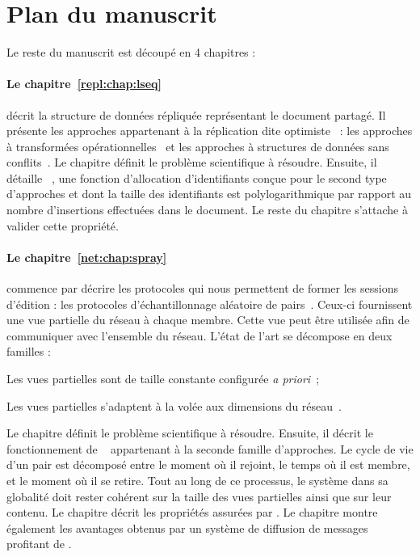 
\section{Plan du manuscrit}

Le reste du manuscrit est découpé en 4 chapitres :

\paragraph{Le chapitre~\ref{repl:chap:lseq}} décrit la structure de données
répliquée représentant le document partagé. Il présente les approches
appartenant à la réplication dite optimiste~\cite{demers1987epidemic,
  saito2005optimistic} : les approches à transformées
opérationnelles~\cite{sun1998achieving, sun2009contextbased} et les approches à
structures de données sans conflits~\cite{burckhardt2014replicated,
  shapiro2011conflict}. Le chapitre définit le problème scientifique à
résoudre. Ensuite, il détaille \LSEQ~\cite{nedelec2013concurrency,
  nedelec2013lseq}, une fonction d'allocation d'identifiants conçue pour le
second type d'approches et dont la taille des identifiants est polylogarithmique
par rapport au nombre d'insertions effectuées dans le document. Le reste du
chapitre s'attache à valider cette propriété.

\paragraph{Le chapitre~\ref{net:chap:spray}} commence par décrire les protocoles
qui nous permettent de former les sessions d'édition : les protocoles
d'échantillonnage aléatoire de pairs~\cite{jelasity2004peer,
  jelasity2007gossip}. Ceux-ci fournissent une vue partielle du réseau à chaque
membre. Cette vue peut être utilisée afin de communiquer avec l'ensemble du
réseau. L'état de l'art se décompose en deux familles :
\begin{inparaenum}[(i)]
\item Les vues partielles sont de taille constante configurée \emph{a
    priori}~\cite{eugster2003lightweight, jelasity2007gossip,
    leitao2007dependable, tolgyeski2009adaptive, voulgaris2005cyclon};
\item Les vues partielles s'adaptent à la volée aux dimensions du
  réseau~\cite{ganesh2001scamp, ganesh2003peer}.
\end{inparaenum}
Le chapitre définit le problème scientifique à résoudre. Ensuite, il décrit le
fonctionnement de \SPRAY~\cite{nedelec2015spray} appartenant à la seconde
famille d'approches. Le cycle de vie d'un pair est décomposé entre le moment où
il rejoint, le temps où il est membre, et le moment où il se retire. Tout au
long de ce processus, le système dans sa globalité doit rester cohérent sur la
taille des vues partielles ainsi que sur leur contenu.  Le chapitre décrit les
propriétés assurées par \SPRAY. Le chapitre montre également les avantages
obtenus par un système de diffusion de messages profitant de \SPRAY.

